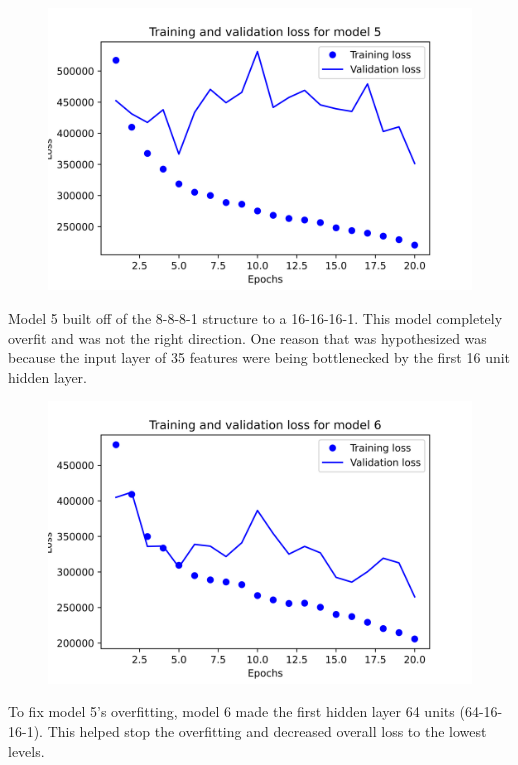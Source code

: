 \documentclass{article}
\begin{document}
    \begin{figure}[H]
        \includegraphics[width=\linewidth]{images/model5.png}
    \end{figure}
    Model 5 built off of the 8-8-8-1 structure to a 16-16-16-1. This model completely overfit and was not the right direction. 
    One reason that was hypothesized was because the input layer of 35 features were being bottlenecked by the first 16 unit hidden layer.

    \begin{figure}[H]
        \includegraphics[width=\linewidth]{images/model6.png}
    \end{figure}
    To fix model 5's overfitting, model 6 made the first hidden layer 64 units (64-16-16-1). This helped stop the overfitting and decreased overall 
    loss to the lowest levels.
\end{document}
